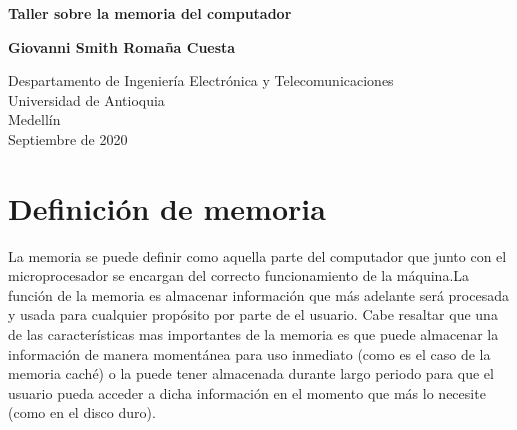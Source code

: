 \documentclass{article}
\begin{document}
\begin{titlepage}
    \begin{center}
        \vspace*{1cm}
            
        \Huge
        \textbf{Taller sobre la memoria del computador}
            
        \vspace{0.5cm}
        \LARGE
            
        \vspace{4.5cm}
            
        \textbf{Giovanni Smith Romaña Cuesta}
            
        \vfill
            
        \vspace{0.8cm}
            
        \Large
        Despartamento de Ingeniería Electrónica y Telecomunicaciones\\
        Universidad de Antioquia\\
        Medellín\\
        Septiembre de 2020
            
    \end{center}
\end{titlepage}

\tableofcontents

\section{Definición de memoria}
La memoria se puede definir como aquella parte del computador que junto con el microprocesador se encargan del correcto funcionamiento de la máquina.La función de la memoria es almacenar información que más adelante será procesada y usada para cualquier propósito por parte de el usuario. Cabe resaltar que una de las características mas importantes de la memoria es que puede almacenar la información de manera momentánea para uso inmediato (como es el caso de la memoria caché) o la puede tener almacenada durante largo periodo para que el usuario pueda acceder a dicha información en el momento que más lo necesite (como en el disco duro).  
\end{document}
